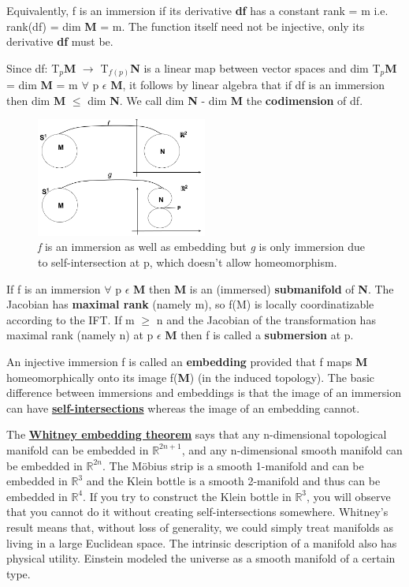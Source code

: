Equivalently, f is an immersion if its derivative \textbf{df} has a constant rank = m i.e. rank(df) = dim \textbf{M} = m.
The function itself need not be injective, only its derivative \textbf{df} must be.

Since df: T$_p$\textbf{M} $\rightarrow$ T$_{f(p)}$\textbf{N} is a linear map between vector spaces
and dim T$_p$\textbf{M} = dim \textbf{M} = m $\forall$ p $\epsilon$ \textbf{M}, 
it follows by linear algebra that if df is an immersion then dim \textbf{M} $\leq$ dim \textbf{N}. 
We call dim \textbf{N} - dim \textbf{M} the \textbf{codimension} of df.
\begin{figure}[ht]
    \begin{center}
        \includegraphics[width=0.5\textwidth]{figures/embedding-immersion.png}
        \caption{\textit{f} is an immersion as well as embedding but \textit{g} is only immersion due to self-intersection at p, which doesn't allow homeomorphism.}
    \end{center}
\end{figure}

If f is an immersion $\forall$ p $\epsilon$ \textbf{M} then \textbf{M} is an (immersed) \textbf{submanifold} of \textbf{N}.
The Jacobian has \textbf{maximal rank} (namely m), so f(M) is locally coordinatizable according to the IFT. 
If m $\geq$ n and the Jacobian of the transformation has maximal rank (namely n) at p $\epsilon$ \textbf{M} then f is called a
\textbf{submersion} at p.

An injective immersion f is called an \textbf{embedding} provided
that f maps \textbf{M} homeomorphically onto its image f(\textbf{M}) (in the induced topology). 
The basic difference between immersions and embeddings is that the image
of an immersion can have \href{https://en.wikipedia.org/wiki/List_of_self-intersecting_polygons}{\textbf{self-intersections}} 
whereas the image of an embedding cannot. 

The \href{https://en.wikipedia.org/wiki/Whitney_embedding_theorem}{\textbf{Whitney embedding theorem}} says that
any n-dimensional topological manifold can be embedded in $\mathbb{R}^{2n+1}$, and any n-dimensional smooth manifold can be embedded in $\mathbb{R}^{2n}$.
The  Möbius strip is a smooth 1-manifold and can be embedded in $\mathbb{R}^{3}$ and 
the Klein bottle is a smooth 2-manifold and thus can be embedded in $\mathbb{R}^{4}$. 
If you try to construct the Klein bottle in $\mathbb{R}^{3}$, 
you will observe that you cannot do it without creating self-intersections somewhere.
Whitney's result means that, without loss of generality, we could simply treat
manifolds as living in a large Euclidean space. The intrinsic description of a manifold also has physical utility. Einstein modeled
the universe as a smooth manifold of a certain type.

